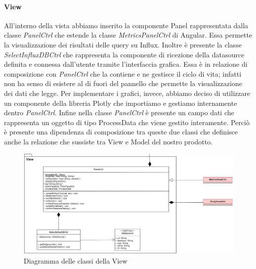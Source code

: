			\paragraph{View}
			All'interno della vista abbiamo inserito la componente Panel rappresentata dalla classe \textit{PanelCtrl} che estende la classe \textit{MetricsPanelCtrl} di Angular. Essa permette la visualizzazione dei risultati delle query su Influx.
			Inoltre è presente la classe \textit{SelectInfluxDBCtrl} che rappresenta la componente di ricezione della datasource definita e connessa dall'utente tramite l'interfaccia grafica. Essa è in relazione di composizione con \textit{PanelCtrl} che la contiene e ne gestisce il ciclo di vita; infatti non ha senso di esistere al di fuori del pannello che permette la visualizzazione dei dati che legge.
			Per implementare i grafici, invece, abbiamo deciso di utilizzare un componente della libreria Plotly che importiamo e gestiamo internamente dentro \textit{PanelCtrl}.
			Infine nella classe \textit{PanelCtrl} è presente un campo dati che rappresenta un oggetto di tipo ProcessData che viene gestito interamente. Perciò è presente una dipendenza di composizione tra queste due classi che definisce anche la relazione che sussiste tra View e Model del nostro prodotto. 
			\mbox{}
			\begin{landscape}
			\begin{figure} [H]
				\includegraphics[width=\linewidth]{./img/Diagrammi/d2.png}
				\caption{Diagramma delle classi della View}
			\end{figure}
		\end{landscape}
